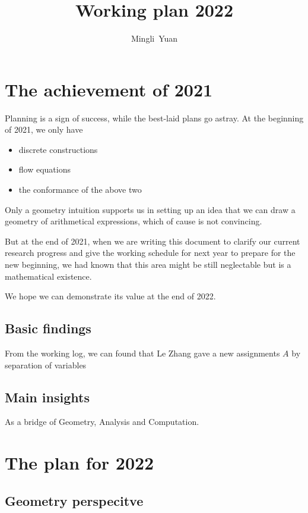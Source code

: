 \documentclass[12pt]{article}
\title{Working plan 2022}
\date{}
\author{Mingli~Yuan}
\begin{document}
\maketitle
\tableofcontents

\section{The achievement of 2021}

Planning is a sign of success, while the best-laid plans go astray. At the beginning of 2021,  we only have
\begin{itemize}
  \item discrete constructions
  \item flow equations
  \item the conformance of the above two
\end{itemize}

Only a geometry intuition supports us in setting up an idea that we can draw a geometry of arithmetical expressions,
which of cause is not convincing.

But at the end of 2021, when we are writing this document to clarify our current research progress
and give the working schedule for next year to prepare for the new beginning,
we had known that this area might be still neglectable but is a mathematical existence.

We hope we can demonstrate its value at the end of 2022.

\subsection{Basic findings}

From the working log, we can found that Le Zhang gave a new assignments $A$ by separation of variables

\subsection{Main insights}

As a bridge of Geometry, Analysis and Computation.

\section{The plan for 2022}

\subsection{Geometry perspecitve}
\end{document}
